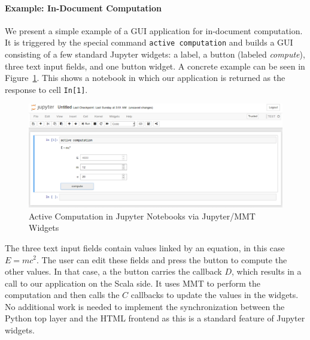 \paragraph*{Example: In-Document Computation}
We present a simple example of a GUI application for in-document computation.
It is triggered by the special command \texttt{active computation} and builds a GUI consisting of a few standard Jupyter widgets: a label, a button (labeled \textit{compute}), three text input fields, and one button widget.
A concrete example can be seen in Figure~\ref{fig:ac}.
This shows a notebook in which our application is returned as the response to cell \texttt{In[1]}.


\begin{figure}[ht]\centering
  \includegraphics[width=15cm]{../D4.11/activecomp}
  \caption{Active Computation in Jupyter Notebooks via Jupyter/MMT Widgets}\label{fig:ac}
\end{figure}

The three text input fields contain values linked by an equation, in this case $E=mc^2$.
The user can edit these fields and press the button to compute the other values.
In that case, a the button carries the callback $D$, which results in a call to our application on the Scala side.
It uses MMT to perform the computation and then calls the $C$ callbacks to update the values in the widgets.
No additional work is needed to implement the synchronization between the Python top layer and the HTML frontend as this is a standard feature of Jupyter widgets.


